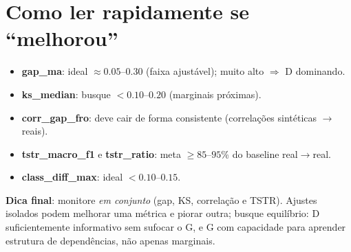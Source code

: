 \documentclass[11pt,a4paper]{article}
\begin{document}
\section{Como ler rapidamente se ``melhorou''}
\begin{itemize}[leftmargin=1.2em]
  \item \textbf{gap\_ma}: ideal $\approx 0.05$--$0.30$ (faixa ajustável); muito alto $\Rightarrow$ D dominando.
  \item \textbf{ks\_median}: busque $<0.10$--$0.20$ (marginais próximas).
  \item \textbf{corr\_gap\_fro}: deve cair de forma consistente (correlações sintéticas $\to$ reais).
  \item \textbf{tstr\_macro\_f1} e \textbf{tstr\_ratio}: meta $\geq 85$--$95$\% do baseline real$\to$real.
  \item \textbf{class\_diff\_max}: ideal $<0.10$--$0.15$.
\end{itemize}

\bigskip
\noindent\textbf{Dica final}: monitore \emph{em conjunto} (gap, KS, correlação e TSTR). Ajustes isolados podem melhorar uma métrica e piorar outra; busque equilíbrio: D suficientemente informativo sem sufocar o G, e G com capacidade para aprender estrutura de dependências, não apenas marginais.
\end{document}
